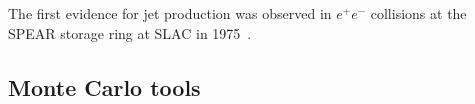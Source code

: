 The first evidence for jet production was observed in $e^+e^-$ collisions at the SPEAR storage ring at SLAC in 1975~\cite{PhysRevLett.35.1609}. 

\subsection{Monte Carlo tools}



